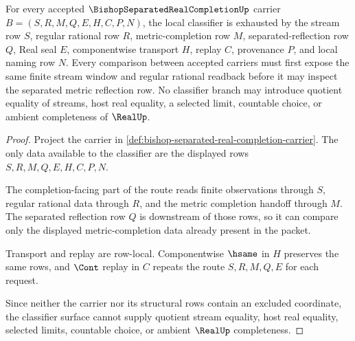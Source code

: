 \begin{theorem}
\label{thm:bishop-separated-real-completion-classifier-surface}
For every accepted $\BishopSeparatedRealCompletionUp$ carrier $B=(S,R,M,Q,E,H,C,P,N)$, the local classifier is exhausted by the stream row $S$, regular rational row $R$, metric-completion row $M$, separated-reflection row $Q$, Real seal $E$, componentwise transport $H$, replay $C$, provenance $P$, and local naming row $N$. Every comparison between accepted carriers must first expose the same finite stream window and regular rational readback before it may inspect the separated metric reflection row. No classifier branch may introduce quotient equality of streams, host real equality, a selected limit, countable choice, or ambient completeness of $\RealUp$.
\end{theorem}
\begin{proof}
Project the carrier in \autoref{def:bishop-separated-real-completion-carrier}. The only data available to the classifier are the displayed rows $S,R,M,Q,E,H,C,P,N$.

The completion-facing part of the route reads finite observations through $S$, regular rational data through $R$, and the metric completion handoff through $M$. The separated reflection row $Q$ is downstream of those rows, so it can compare only the displayed metric-completion data already present in the packet.

Transport and replay are row-local. Componentwise $\hsame$ in $H$ preserves the same rows, and $\Cont$ replay in $C$ repeats the route $S,R,M,Q,E$ for each request.

Since neither the carrier nor its structural rows contain an excluded coordinate, the classifier surface cannot supply quotient stream equality, host real equality, selected limits, countable choice, or ambient $\RealUp$ completeness.
\end{proof}

